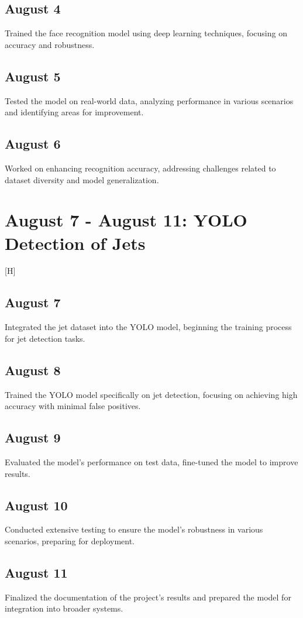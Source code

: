 \documentclass{report}
\begin{document}
\subsection*{August 4}
Trained the face recognition model using deep learning techniques, focusing on accuracy and robustness.

\subsection*{August 5}
Tested the model on real-world data, analyzing performance in various scenarios and identifying areas for improvement.

\subsection*{August 6}
Worked on enhancing recognition accuracy, addressing challenges related to dataset diversity and model generalization.

\section{August 7 - August 11: YOLO Detection of Jets}[H]

\subsection*{August 7}
Integrated the jet dataset into the YOLO model, beginning the training process for jet detection tasks.

\subsection*{August 8}
Trained the YOLO model specifically on jet detection, focusing on achieving high accuracy with minimal false positives.

\subsection*{August 9}
Evaluated the model’s performance on test data, fine-tuned the model to improve results.

\subsection*{August 10}
Conducted extensive testing to ensure the model’s robustness in various scenarios, preparing for deployment.

\subsection*{August 11}
Finalized the documentation of the project’s results and prepared the model for integration into broader systems.
\end{document}
